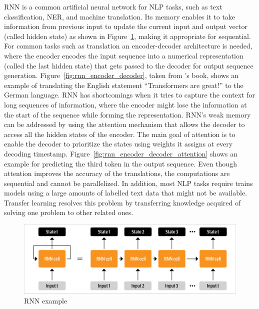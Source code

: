 \ac{RNN} \cite{hopfieldNeuralNetworksPhysical1982} is a common artificial neural network for
\ac{NLP} tasks, such as text classification, \ac{NER}, and machine translation. Its memory enables
it to take information from previous input to update the current input and output vector (called
hidden state) as shown in Figure~\ref{fig:rnn_example}, making it appropriate for sequential. For common
tasks such as translation  an encoder-decoder architecture is needed, where the encoder encodes the
input sequence into a numerical representation (called the last hidden state) that gets passed to
the decoder for output sequence generation. Figure~\ref{fig:rnn_encoder_decoder}, taken from
\citeauthor{tunstallNaturalLanguageProcessing2022}'s book\cite{tunstallNaturalLanguageProcessing2022}, shows an example of translating the
English statement ``Transformers are great!'' to the German language. \ac{RNN} has shortcomings when it tries to
capture the context for long sequences of information, where the encoder might lose the information
at the start of the sequence while forming the representation. \ac{RNN}'s  weak memory can be
addressed by using the attention mechanism that allows the decoder to access all the hidden states
of the encoder. The main goal of attention is to enable the decoder to prioritize the states using
weights it assigns at every decoding timestamp. Figure~\ref{fig:rnn_encoder_decoder_attention} shows
an example for predicting the third token in the output sequence. Even though attention improves the
accuracy of the translations, the computations are sequential and cannot be parallelized. In
addition, most \ac{NLP} tasks require trains models using a large amounts of labelled text data that
might not be available. Transfer learning resolves this problem by transferring knowledge acquired
of solving one problem to other related ones.

\begin{figure}[H]
\begin{center}
  \includegraphics[width=\columnwidth,trim={0.1cm 0.1cm 0.1cm 0.1cm},clip]{./images/unrolling_rnn.png}
\end{center}
\caption{RNN example \cite{tunstallNaturalLanguageProcessing2022}}
\label{fig:rnn_example}
\end{figure}

